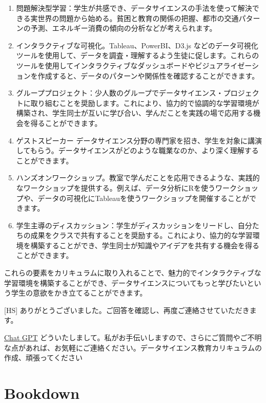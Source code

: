\documentclass[
]{book}
\theoremstyle{definition}
\theoremstyle{definition}
\theoremstyle{definition}
\theoremstyle{definition}
\theoremstyle{remark}
\begin{document}
\begin{enumerate}
\def\labelenumi{\arabic{enumi}.}
\item
  問題解決型学習：学生が共感でき、データサイエンスの手法を使って解決できる実世界の問題から始める。貧困と教育の関係の把握、都市の交通パターンの予測、エネルギー消費の傾向の分析などが考えられます。
\item
  インタラクティブな可視化。Tableau、PowerBI、D3.js などのデータ可視化ツールを使用して、データを調査・理解するよう生徒に促します。これらのツールを使用してインタラクティブなダッシュボードやビジュアライゼーションを作成すると、データのパターンや関係性を確認することができます。
\item
  グループプロジェクト：少人数のグループでデータサイエンス・プロジェクトに取り組むことを奨励します。これにより、協力的で協調的な学習環境が構築され、学生同士が互いに学び合い、学んだことを実践の場で応用する機会を得ることができます。
\item
  ゲストスピーカー データサイエンス分野の専門家を招き、学生を対象に講演してもらう。データサイエンスがどのような職業なのか、より深く理解することができます。
\item
  ハンズオンワークショップ。教室で学んだことを応用できるような、実践的なワークショップを提供する。例えば、データ分析にRを使うワークショップや、データの可視化にTableauを使うワークショップを開催することができます。
\item
  学生主導のディスカッション：学生がディスカッションをリードし、自分たちの成果をクラスで共有することを奨励する。これにより、協力的な学習環境を構築することができ、学生同士が知識やアイデアを共有する機会を得ることができます。
\end{enumerate}

これらの要素をカリキュラムに取り入れることで、魅力的でインタラクティブな学習環境を構築することができ、データサイエンスについてもっと学びたいという学生の意欲をかき立てることができます。

{[}HS{]} ありがとうございました。ご回答を確認し、再度ご連絡させていただきます。

\protect\hyperlink{chatgpt}{Chat GPT} どういたしまして。私がお手伝いしますので、さらにご質問やご不明な点があれば、お気軽にご連絡ください。データサイエンス教育カリキュラムの作成、頑張ってください

\hypertarget{bookdown}{%
\chapter{Bookdown}\label{bookdown}}
\end{document}
